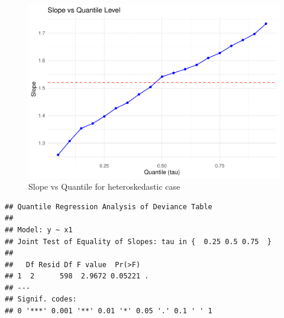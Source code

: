\documentclass[fleqn,8pt]{latex/stylish_article} %
\newenvironment{Shaded}{\begin{snugshade}}{\end{snugshade}}
\newcommand{\FloatTok}[1]{\textcolor[rgb]{0.00,0.00,0.81}{{#1}}}
\newcommand{\SpecialCharTok}[1]{\textcolor[rgb]{0.00,0.00,0.00}{{#1}}}
\newcommand{\OtherTok}[1]{\textcolor[rgb]{0.56,0.35,0.01}{{#1}}}
\newcommand{\FunctionTok}[1]{\textcolor[rgb]{0.00,0.00,0.00}{{#1}}}
\newcommand{\AttributeTok}[1]{\textcolor[rgb]{0.77,0.63,0.00}{{#1}}}
\newcommand{\NormalTok}[1]{{#1}}
\begin{document}
\begin{figure}

{\centering \includegraphics[width=0.8\linewidth]{ADR_project_files/figure-latex/plot-coef-vs-quantile-1} 

}

\caption{Slope vs Quantile for heteroskedastic case}\label{fig:plot-coef-vs-quantile}
\end{figure}

\begin{Shaded}
\end{Shaded}

\begin{verbatim}
## Quantile Regression Analysis of Deviance Table
## 
## Model: y ~ x1
## Joint Test of Equality of Slopes: tau in {  0.25 0.5 0.75  }
## 
##   Df Resid Df F value  Pr(>F)  
## 1  2      598  2.9672 0.05221 .
## ---
## Signif. codes:  
## 0 '***' 0.001 '**' 0.01 '*' 0.05 '.' 0.1 ' ' 1
\end{verbatim}
\end{document}
